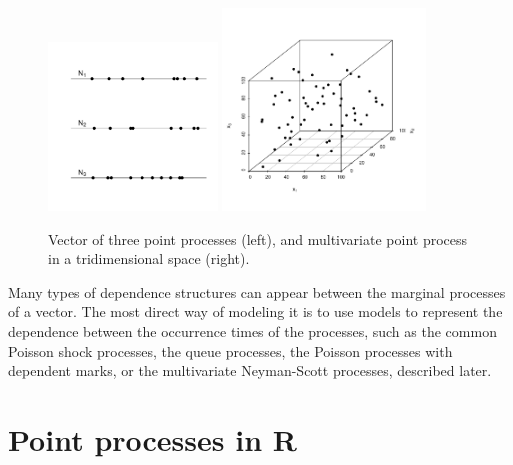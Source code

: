 \begin{figure}[t]
	\begin{center}
		\includegraphics[width=0.4\textwidth]{figure/graficod3.pdf}
		\hspace*{1cm}
		\includegraphics[width=0.48\textwidth]{figure/grafico3d.pdf}
	\end{center}
	\caption{\label{Fig1a} Vector of    three point processes (left), and  multivariate point process  in a tridimensional space (right).}
\end{figure}



Many  types of dependence structures  can appear  between  the marginal processes of a vector. The most direct way of modeling it is to use   models   to represent  the dependence between the occurrence times  of the  processes, such as the common Poisson shock processes,  the queue processes, the Poisson processes  with dependent marks, or the  multivariate Neyman-Scott processes, described later.





\section{Point processes in R}


\label{Section3}


